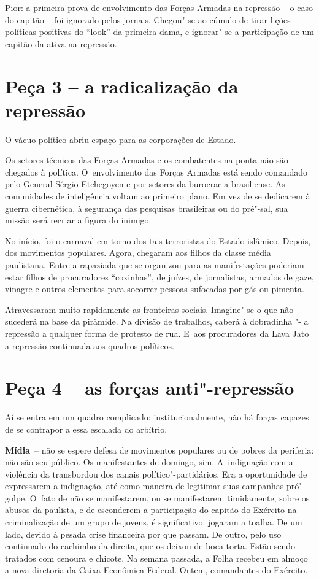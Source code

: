 Pior: a primeira prova de envolvimento das Forças Armadas na repressão
-- o caso do capitão -- foi ignorado pelos jornais. Chegou"-se ao cúmulo
de tirar lições políticas positivas do ``look'' da primeira dama, e
ignorar"-se a participação de um capitão da ativa na repressão.

\section{Peça 3 -- a radicalização da repressão}

O vácuo político abriu espaço para as corporações de Estado.

Os setores técnicos das Forças Armadas e os combatentes na ponta não são
chegados à política. O~envolvimento das Forças Armadas está sendo
comandado pelo General Sérgio Etchegoyen e por setores da burocracia
brasiliense. As comunidades de inteligência voltam ao primeiro plano. Em
vez de se dedicarem à guerra cibernética, à segurança das pesquisas
brasileiras ou do pré"-sal, sua missão será recriar a figura do inimigo.

No início, foi o carnaval em torno dos tais terroristas do Estado
islâmico. Depois, dos movimentos populares. Agora, chegaram aos filhos
da classe média paulistana. Entre a rapaziada que se organizou para as
manifestações poderiam estar filhos de procuradores ``coxinhas'', de
juízes, de jornalistas, armados de gaze, vinagre e outros elementos para
socorrer pessoas sufocadas por gás ou pimenta.

Atravessaram muito rapidamente as fronteiras sociais. Imagine"-se o que
não sucederá na base da pirâmide. Na divisão de trabalhos, caberá à
dobradinha "- a repressão a qualquer forma de protesto de rua. E~aos
procuradores da Lava Jato~ a repressão continuada aos quadros políticos.

\section{Peça 4 -- as forças anti"-repressão}

Aí se entra em um quadro complicado: institucionalmente, não há forças
capazes de se contrapor a essa escalada do arbítrio.

\textbf{Mídia}~-- não se espere defesa de movimentos populares ou de
pobres da periferia: não são seu público. Os manifestantes de domingo,
sim. A~indignação com a violência da  transbordou dos canais
político"-partidários. Era a oportunidade de expressarem a indignação,
até como maneira de legitimar suas campanhas pró"-golpe. O~fato de não se
manifestarem, ou se manifestarem timidamente, sobre os abusos da 
paulista, e de esconderem a participação do capitão do Exército na
criminalização de um grupo de jovens, é significativo: jogaram a toalha.
De um lado, devido à pesada crise financeira por que passam. De outro,
pelo uso continuado do cachimbo da direita, que os deixou de boca torta.
Estão sendo tratados com cenoura e chicote. Na semana passada, a Folha
recebeu em almoço a nova diretoria da Caixa Econômica Federal. Ontem,
comandantes do Exército.


